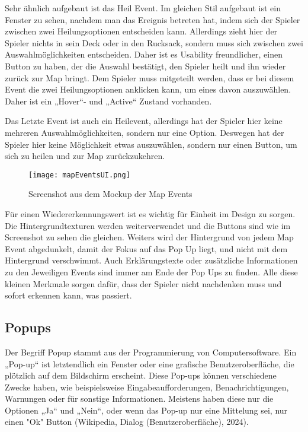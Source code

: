 Sehr ähnlich aufgebaut ist das Heil Event. Im gleichen Stil aufgebaut ist ein Fenster zu sehen, nachdem man das Ereignis betreten hat, indem sich der Spieler zwischen zwei Heilungsoptionen entscheiden kann. Allerdings zieht hier der Spieler nichts in sein Deck oder in den Rucksack, sondern muss sich zwischen zwei Auswahlmöglichkeiten entscheiden. Daher ist es Usability freundlicher, einen Button zu haben, der die Auswahl bestätigt, den Spieler heilt und ihn wieder zurück zur Map bringt. Dem Spieler muss mitgeteilt werden, dass er bei diesem Event die zwei Heilungsoptionen anklicken kann, um eines davon auszuwählen. Daher ist ein „Hover“- und „Active“ Zustand vorhanden.

Das Letzte Event ist auch ein Heilevent, allerdings hat der Spieler hier keine mehreren Auswahlmöglichkeiten, sondern nur eine Option. Deswegen hat der Spieler hier keine Möglichkeit etwas auszuwählen, sondern nur einen Button, um sich zu heilen und zur Map zurückzukehren.

\begin{figure}[H]
    \centering
    \texttt{[image: mapEventsUI.png]}
    \caption{Screenshot aus dem Mockup der Map Events}
\end{figure}

Für einen Wiedererkennungswert ist es wichtig für Einheit im Design zu sorgen. Die Hintergrundtexturen werden weiterverwendet und die Buttons sind wie im Screenshot zu sehen die gleichen. Weiters wird der Hintergrund von jedem Map Event abgedunkelt, damit der Fokus auf das Pop Up liegt, und nicht mit dem Hintergrund verschwimmt. Auch Erklärungstexte oder zusätzliche Informationen zu den Jeweiligen Events sind immer am Ende der Pop Ups zu finden. Alle diese kleinen Merkmale sorgen dafür, dass der Spieler nicht nachdenken muss und sofort erkennen kann, was passiert.

\subsection{Popups}

Der Begriff Popup stammt aus der Programmierung von Computersoftware. Ein „Pop-up“ ist letztendlich ein Fenster oder eine grafische Benutzeroberfläche, die plötzlich auf dem Bildschirm erscheint. Diese Pop-ups können verschiedene Zwecke haben, wie beispielsweise Eingabeaufforderungen, Benachrichtigungen, Warnungen oder für sonstige Informationen. Meistens haben diese nur die Optionen „Ja“ und „Nein“, oder wenn das Pop-up nur eine Mittelung sei, nur einen "Ok" Button (Wikipedia, Dialog (Benutzeroberfläche), 2024).

